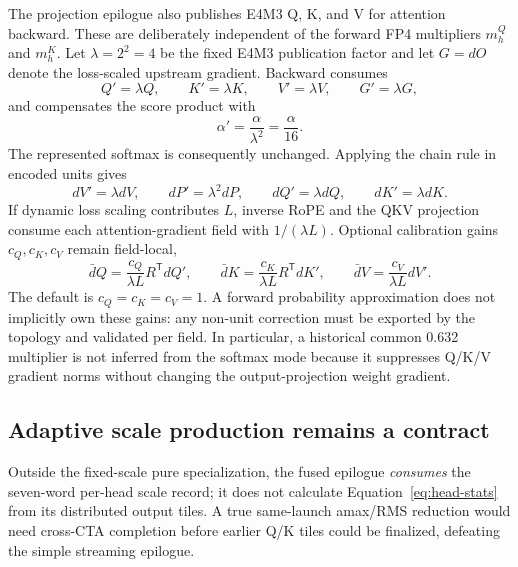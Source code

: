 The projection epilogue also publishes E4M3 Q, K, and V for attention
backward.  These are deliberately independent of the forward FP4 multipliers
$m^Q_h$ and $m^K_h$.  Let $\lambda=2^2=4$ be the fixed E4M3 publication
factor and let $G=dO$ denote the loss-scaled upstream gradient.  Backward
consumes
\begin{equation}
  Q'=\lambda Q,\qquad K'=\lambda K,\qquad
  V'=\lambda V,\qquad G'=\lambda G,
  \label{eq:d64-fixed-fp8-publication}
\end{equation}
and compensates the score product with
\begin{equation}
  \alpha'=\frac{\alpha}{\lambda^2}=\frac{\alpha}{16}.
  \label{eq:d64-fixed-fp8-score-scale}
\end{equation}
The represented softmax is consequently unchanged.  Applying the chain rule
in encoded units gives
\begin{equation}
  dV'=\lambda dV,\qquad dP'=\lambda^2dP,\qquad
  dQ'=\lambda dQ,\qquad dK'=\lambda dK.
  \label{eq:d64-fixed-fp8-gradient-units}
\end{equation}
If dynamic loss scaling contributes $L$, inverse RoPE and the QKV projection
consume each attention-gradient field with $1/(\lambda L)$.  Optional
calibration gains $c_Q,c_K,c_V$ remain field-local,
\begin{equation}
  \bar dQ=\frac{c_Q}{\lambda L}R^{\mathsf T}dQ',\qquad
  \bar dK=\frac{c_K}{\lambda L}R^{\mathsf T}dK',\qquad
  \bar dV=\frac{c_V}{\lambda L}dV'.
  \label{eq:d64-field-local-gradient-decode}
\end{equation}
The default is $c_Q=c_K=c_V=1$.  A forward probability approximation does
not implicitly own these gains: any non-unit correction must be exported by
the topology and validated per field.  In particular, a historical common
0.632 multiplier is not inferred from the softmax mode because it suppresses
Q/K/V gradient norms without changing the output-projection weight gradient.

\subsection{Adaptive scale production remains a contract}

Outside the fixed-scale pure specialization, the fused epilogue
\emph{consumes} the seven-word per-head scale record; it does not calculate
Equation~\ref{eq:head-stats} from its distributed output tiles.  A true
same-launch amax/RMS reduction would need cross-CTA completion before earlier
Q/K tiles could be finalized, defeating the simple streaming epilogue.

